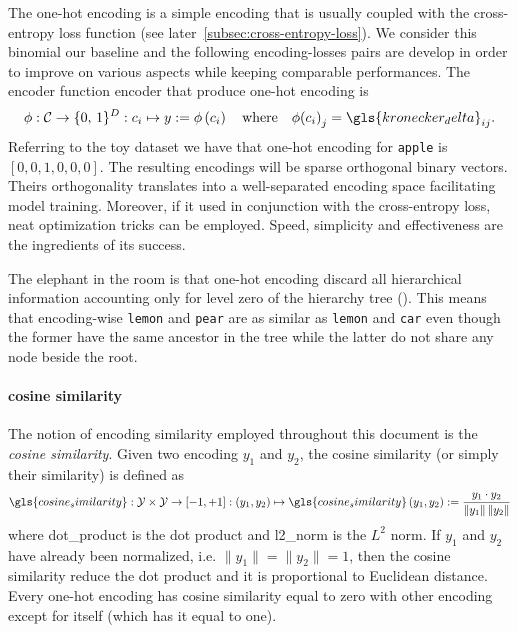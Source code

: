 The one-hot encoding is a simple encoding that is usually coupled with the
cross-entropy loss function (see later~\cref{subsec:cross-entropy-loss}). We
consider this binomial our baseline and the following encoding-losses pairs are
develop in order to improve on various aspects while keeping comparable
performances. The encoder function \gls{encoder} that produce one-hot encoding is
\begin{equation}
  \phi: \mathcal{C} \to \{0, \,1\}^{D}
      : c_i \mapsto y := \phi \left(c_i\right)
  \quad \text{where} \quad
  \phi{\left(c_i\right)}_j = \gls{kronecker_delta}_{ij}.
  \label{eq:one-hot-encoding}
\end{equation}
Referring to the toy dataset we have that one-hot encoding for \texttt{apple}
is $\left[0, 0, 1, 0, 0, 0\right]$. The resulting encodings will be sparse
orthogonal binary vectors. Theirs orthogonality translates into a
well-separated encoding space facilitating model training. Moreover, if it used
in conjunction with the cross-entropy loss, neat optimization tricks can be
employed. Speed, simplicity and effectiveness are the ingredients of its success.

The elephant in the room is that one-hot encoding discard all hierarchical
information accounting only for level zero of the hierarchy tree
(). This means that encoding-wise \texttt{lemon} and
\texttt{pear} are as similar as \texttt{lemon} and \texttt{car} even though the
former have the same ancestor in the tree while the latter do not share any
node beside the root.

\paragraph{cosine similarity} The notion of encoding similarity employed throughout
this document is the \emph{cosine similarity}. Given two encoding $y_1$ and $y_2$,
the cosine similarity (or simply their similarity) is defined as
\begin{equation}
  \gls{cosine_similarity}: \mathcal{Y} \times \mathcal{Y} \to \left[-1, +1\right]
  : (y_1, y_2) \mapsto \gls{cosine_similarity}\,(y_1, y_2) :=
  \frac{y_1 \cdot y_2}{\|y_1\| \, \|y_2\|}
  \label{eq:cosine-simiarity}
\end{equation}
where \gls{dot_product} is the dot product and \gls{l2_norm} is the $L^2$ norm.
If $y_1$ and $y_2$ have already been normalized, i.e. $\|y_1\| = \|y_2\| = 1$,
then the cosine similarity reduce the dot product and it is proportional to
Euclidean distance. Every one-hot encoding has cosine similarity equal to zero
with other encoding except for itself (which has it equal to one).


